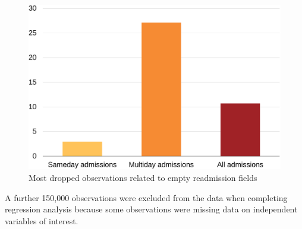 \documentclass[submission]{grattan}
\begin{document}
\begin{figure}
\caption{Most dropped observations related to empty readmission fields}\label{fig:most-dropped-obs-related-empty-readmission-fields}
\includegraphics[page=22]{atlas/comps_charts.pdf}
\end{figure}

A further 150,000 observations were excluded from the data when completing regression analysis because some observations were missing data on independent variables of interest.
\end{document}
